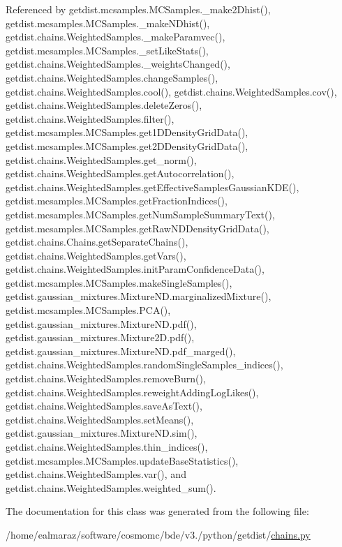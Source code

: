 Referenced by getdist.\+mcsamples.\+M\+C\+Samples.\+\_\+make2\+Dhist(), getdist.\+mcsamples.\+M\+C\+Samples.\+\_\+make\+N\+Dhist(), getdist.\+chains.\+Weighted\+Samples.\+\_\+make\+Paramvec(), getdist.\+mcsamples.\+M\+C\+Samples.\+\_\+set\+Like\+Stats(), getdist.\+chains.\+Weighted\+Samples.\+\_\+weights\+Changed(), getdist.\+chains.\+Weighted\+Samples.\+change\+Samples(), getdist.\+chains.\+Weighted\+Samples.\+cool(), getdist.\+chains.\+Weighted\+Samples.\+cov(), getdist.\+chains.\+Weighted\+Samples.\+delete\+Zeros(), getdist.\+chains.\+Weighted\+Samples.\+filter(), getdist.\+mcsamples.\+M\+C\+Samples.\+get1\+D\+Density\+Grid\+Data(), getdist.\+mcsamples.\+M\+C\+Samples.\+get2\+D\+Density\+Grid\+Data(), getdist.\+chains.\+Weighted\+Samples.\+get\+\_\+norm(), getdist.\+chains.\+Weighted\+Samples.\+get\+Autocorrelation(), getdist.\+chains.\+Weighted\+Samples.\+get\+Effective\+Samples\+Gaussian\+K\+D\+E(), getdist.\+mcsamples.\+M\+C\+Samples.\+get\+Fraction\+Indices(), getdist.\+mcsamples.\+M\+C\+Samples.\+get\+Num\+Sample\+Summary\+Text(), getdist.\+mcsamples.\+M\+C\+Samples.\+get\+Raw\+N\+D\+Density\+Grid\+Data(), getdist.\+chains.\+Chains.\+get\+Separate\+Chains(), getdist.\+chains.\+Weighted\+Samples.\+get\+Vars(), getdist.\+chains.\+Weighted\+Samples.\+init\+Param\+Confidence\+Data(), getdist.\+mcsamples.\+M\+C\+Samples.\+make\+Single\+Samples(), getdist.\+gaussian\+\_\+mixtures.\+Mixture\+N\+D.\+marginalized\+Mixture(), getdist.\+mcsamples.\+M\+C\+Samples.\+P\+C\+A(), getdist.\+gaussian\+\_\+mixtures.\+Mixture\+N\+D.\+pdf(), getdist.\+gaussian\+\_\+mixtures.\+Mixture2\+D.\+pdf(), getdist.\+gaussian\+\_\+mixtures.\+Mixture\+N\+D.\+pdf\+\_\+marged(), getdist.\+chains.\+Weighted\+Samples.\+random\+Single\+Samples\+\_\+indices(), getdist.\+chains.\+Weighted\+Samples.\+remove\+Burn(), getdist.\+chains.\+Weighted\+Samples.\+reweight\+Adding\+Log\+Likes(), getdist.\+chains.\+Weighted\+Samples.\+save\+As\+Text(), getdist.\+chains.\+Weighted\+Samples.\+set\+Means(), getdist.\+gaussian\+\_\+mixtures.\+Mixture\+N\+D.\+sim(), getdist.\+chains.\+Weighted\+Samples.\+thin\+\_\+indices(), getdist.\+mcsamples.\+M\+C\+Samples.\+update\+Base\+Statistics(), getdist.\+chains.\+Weighted\+Samples.\+var(), and getdist.\+chains.\+Weighted\+Samples.\+weighted\+\_\+sum().



The documentation for this class was generated from the following file\+:\begin{DoxyCompactItemize}
\item 
/home/ealmaraz/software/cosmomc/bde/v3./python/getdist/\mbox{\hyperlink{chains_8py}{chains.\+py}}\end{DoxyCompactItemize}
